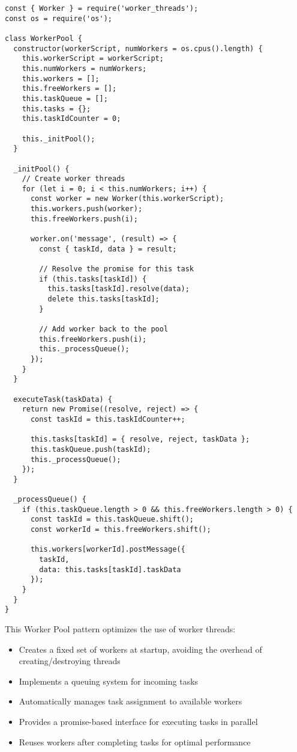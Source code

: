 \documentclass[12pt,letterpaper]{article}
\newenvironment{macterminal}{%
    \begin{mdframed}[
        linecolor=terminalFrame,
        backgroundcolor=terminalBg,
        roundcorner=5pt,
        skipabove=5pt,
        skipbelow=5pt,
        linewidth=1pt,
        innertopmargin=5pt,
        frametitle={%
            \tikz[baseline=(current bounding box.east), outer sep=0pt]{
                \fill[red!80!black] (0,0) circle (5pt);
                \fill[yellow!80!black] (0.7,0) circle (5pt);
                \fill[green!70!black] (1.4,0) circle (5pt);
            }
        },
        frametitlealignment=\raggedright,
        frametitleaboveskip=8pt,
        frametitlebelowskip=0pt,
    ]
}{%
    \end{mdframed}%
}
\begin{document}
\begin{macterminal}
\begin{lstlisting}
const { Worker } = require('worker_threads');
const os = require('os');

class WorkerPool {
  constructor(workerScript, numWorkers = os.cpus().length) {
    this.workerScript = workerScript;
    this.numWorkers = numWorkers;
    this.workers = [];
    this.freeWorkers = [];
    this.taskQueue = [];
    this.tasks = {};
    this.taskIdCounter = 0;
    
    this._initPool();
  }
  
  _initPool() {
    // Create worker threads
    for (let i = 0; i < this.numWorkers; i++) {
      const worker = new Worker(this.workerScript);
      this.workers.push(worker);
      this.freeWorkers.push(i);
      
      worker.on('message', (result) => {
        const { taskId, data } = result;
        
        // Resolve the promise for this task
        if (this.tasks[taskId]) {
          this.tasks[taskId].resolve(data);
          delete this.tasks[taskId];
        }
        
        // Add worker back to the pool
        this.freeWorkers.push(i);
        this._processQueue();
      });
    }
  }
  
  executeTask(taskData) {
    return new Promise((resolve, reject) => {
      const taskId = this.taskIdCounter++;
      
      this.tasks[taskId] = { resolve, reject, taskData };
      this.taskQueue.push(taskId);
      this._processQueue();
    });
  }
  
  _processQueue() {
    if (this.taskQueue.length > 0 && this.freeWorkers.length > 0) {
      const taskId = this.taskQueue.shift();
      const workerId = this.freeWorkers.shift();
      
      this.workers[workerId].postMessage({
        taskId,
        data: this.tasks[taskId].taskData
      });
    }
  }
}
\end{lstlisting}
\end{macterminal}

This Worker Pool pattern optimizes the use of worker threads:
\begin{itemize}
    \item Creates a fixed set of workers at startup, avoiding the overhead of creating/destroying threads
    \item Implements a queuing system for incoming tasks
    \item Automatically manages task assignment to available workers
    \item Provides a promise-based interface for executing tasks in parallel
    \item Reuses workers after completing tasks for optimal performance
\end{itemize}
\end{document}
